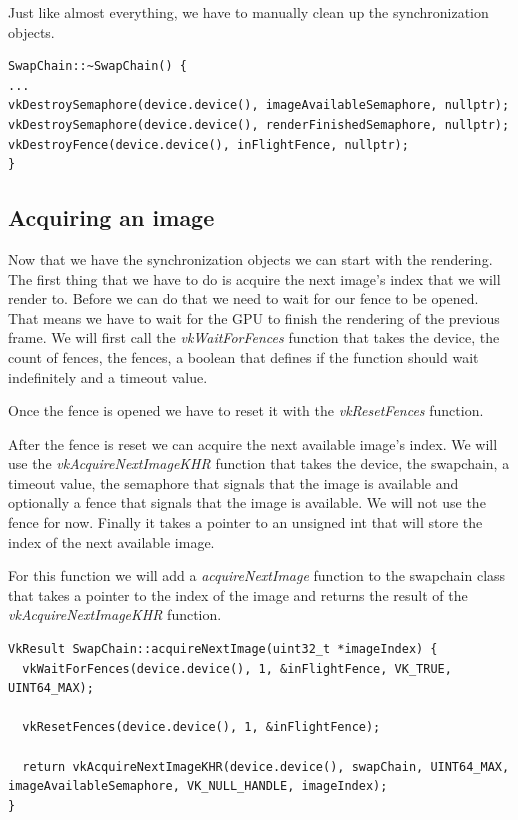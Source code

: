 \documentclass[12pt]{report} \usepackage{preamble}
\begin{document}
Just like almost everything, we have to manually clean up the synchronization objects.

\begin{lstlisting}[Language=C++]
SwapChain::~SwapChain() {
...
vkDestroySemaphore(device.device(), imageAvailableSemaphore, nullptr);
vkDestroySemaphore(device.device(), renderFinishedSemaphore, nullptr);
vkDestroyFence(device.device(), inFlightFence, nullptr);
}
\end{lstlisting}

\subsection{Acquiring an image}

Now that we have the synchronization objects we can start with the rendering. The first thing that we have to do
is acquire the next image's index that we will render to. Before we can do that we need to wait for our fence to be opened.
That means we have to wait for the GPU to finish the rendering of the previous frame.
We will first call the \textit{vkWaitForFences} function that takes the device, the count of fences,
the fences, a boolean that defines if the function should wait indefinitely and a timeout value.

Once the fence is opened we have to reset it with the \textit{vkResetFences} function.

After the fence is reset we can acquire the next available image's index. We will use the \textit{vkAcquireNextImageKHR} function that
takes the device, the swapchain, a timeout value, the semaphore that signals that the image is available and optionally a fence that
signals that the image is available. We will not use the fence for now. Finally it takes a pointer to an unsigned int that will store
the index of the next available image.

For this function we will add a \textit{acquireNextImage} function to the swapchain class that takes a pointer to the index of the image
and returns the result of the \textit{vkAcquireNextImageKHR} function.

\begin{lstlisting}[Language=C++]
VkResult SwapChain::acquireNextImage(uint32_t *imageIndex) {
  vkWaitForFences(device.device(), 1, &inFlightFence, VK_TRUE, UINT64_MAX);

  vkResetFences(device.device(), 1, &inFlightFence);

  return vkAcquireNextImageKHR(device.device(), swapChain, UINT64_MAX, imageAvailableSemaphore, VK_NULL_HANDLE, imageIndex);
}
\end{lstlisting}
\end{document}
